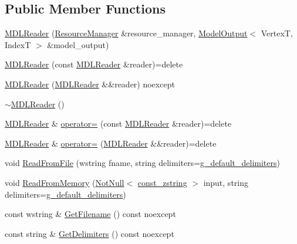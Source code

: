 \subsection*{Public Member Functions}
\begin{DoxyCompactItemize}
\item 
\mbox{\hyperlink{classmage_1_1rendering_1_1loader_1_1_m_d_l_reader_acc6d10b858b43608cb22d9086ae227fd}{M\+D\+L\+Reader}} (\mbox{\hyperlink{classmage_1_1rendering_1_1_resource_manager}{Resource\+Manager}} \&resource\+\_\+manager, \mbox{\hyperlink{structmage_1_1rendering_1_1_model_output}{Model\+Output}}$<$ VertexT, IndexT $>$ \&model\+\_\+output)
\item 
\mbox{\hyperlink{classmage_1_1rendering_1_1loader_1_1_m_d_l_reader_a98d83bb5d8cec2b8e665f08bc50068f6}{M\+D\+L\+Reader}} (const \mbox{\hyperlink{classmage_1_1rendering_1_1loader_1_1_m_d_l_reader}{M\+D\+L\+Reader}} \&reader)=delete
\item 
\mbox{\hyperlink{classmage_1_1rendering_1_1loader_1_1_m_d_l_reader_a77f5be43642636faf71e7fb3eed7e050}{M\+D\+L\+Reader}} (\mbox{\hyperlink{classmage_1_1rendering_1_1loader_1_1_m_d_l_reader}{M\+D\+L\+Reader}} \&\&reader) noexcept
\item 
\mbox{\hyperlink{classmage_1_1rendering_1_1loader_1_1_m_d_l_reader_a2f4c6bd8c2ef49180538ddfe5530e230}{$\sim$\+M\+D\+L\+Reader}} ()
\item 
\mbox{\hyperlink{classmage_1_1rendering_1_1loader_1_1_m_d_l_reader}{M\+D\+L\+Reader}} \& \mbox{\hyperlink{classmage_1_1rendering_1_1loader_1_1_m_d_l_reader_a76e89824650cdf1d737048ac06862166}{operator=}} (const \mbox{\hyperlink{classmage_1_1rendering_1_1loader_1_1_m_d_l_reader}{M\+D\+L\+Reader}} \&reader)=delete
\item 
\mbox{\hyperlink{classmage_1_1rendering_1_1loader_1_1_m_d_l_reader}{M\+D\+L\+Reader}} \& \mbox{\hyperlink{classmage_1_1rendering_1_1loader_1_1_m_d_l_reader_a2afa24fc79ecdcf15f0cbf09f7a78e52}{operator=}} (\mbox{\hyperlink{classmage_1_1rendering_1_1loader_1_1_m_d_l_reader}{M\+D\+L\+Reader}} \&\&reader)=delete
\item 
void \mbox{\hyperlink{classmage_1_1rendering_1_1loader_1_1_m_d_l_reader_a6ee0c53351656ac4cd92db1d7c372cff}{Read\+From\+File}} (wstring fname, string delimiters=\mbox{\hyperlink{namespacemage_aa161198415efd9349da6187663250aea}{g\+\_\+default\+\_\+delimiters}})
\item 
void \mbox{\hyperlink{classmage_1_1rendering_1_1loader_1_1_m_d_l_reader_a5aa9068792817b6d6dc840a44b788159}{Read\+From\+Memory}} (\mbox{\hyperlink{namespacemage_a8769f9d670d6b585ea306cb1062af94b}{Not\+Null}}$<$ \mbox{\hyperlink{namespacemage_abfd9206dc607ceb5d13ec68bf075a5c0}{const\+\_\+zstring}} $>$ input, string delimiters=\mbox{\hyperlink{namespacemage_aa161198415efd9349da6187663250aea}{g\+\_\+default\+\_\+delimiters}})
\item 
const wstring \& \mbox{\hyperlink{classmage_1_1rendering_1_1loader_1_1_m_d_l_reader_a682ed8030c99a62d4409a01f9efa6d6b}{Get\+Filename}} () const noexcept
\item 
const string \& \mbox{\hyperlink{classmage_1_1rendering_1_1loader_1_1_m_d_l_reader_aa00e1e27b614e11ec9f70e52d0bac551}{Get\+Delimiters}} () const noexcept
\end{DoxyCompactItemize}
